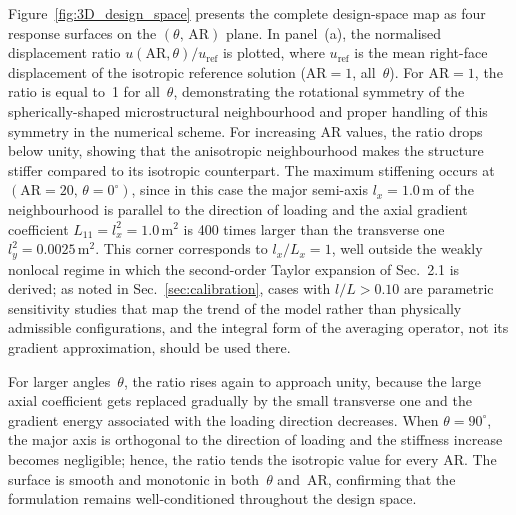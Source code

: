 \documentclass[final,3p,times,fleqn]{elsarticle}
\newcommand{\revtwo}[1]{\textcolor{revtwocolor}{#1}}
\begin{document}
Figure~\ref{fig:3D_design_space} presents the complete design-space
map as four response surfaces on the
$(\theta,\,\mathrm{AR})$ plane.
In panel~(a), the normalised displacement ratio
$u(\mathrm{AR},\theta)/u_{\mathrm{ref}}$ is plotted, where $u_{\mathrm{ref}}$
is the mean right-face displacement of the isotropic reference solution
($\mathrm{AR}=1$, all~$\theta$). For $\mathrm{AR}=1$, the ratio is equal to~1
for all~$\theta$, demonstrating the rotational symmetry of the spherically-shaped
microstructural neighbourhood and proper handling of this symmetry in the
numerical scheme.
For increasing AR values, the ratio drops below unity, showing
that the anisotropic neighbourhood makes the structure stiffer compared to
its isotropic counterpart.
The maximum stiffening occurs at
$(\mathrm{AR}=20,\,\theta=0^{\circ})$, since in this case the major semi-axis 
$l_{x} = 1.0$\,m of the neighbourhood is parallel to the direction of loading
and the axial gradient coefficient $L_{11}
=l_{x}^{2} = 1.0$\,m$^{2}$ is 400 times larger than the transverse one 
$l_{y}^{2} = 0.0025$\,m$^{2}$.
\revtwo{This corner corresponds to $l_{x}/L_{x}=1$, well outside the
weakly nonlocal regime in which the second-order Taylor expansion of
Sec.~2.1 is derived; as noted in
Sec.~\ref{sec:calibration}, cases with $l/L>0.10$ are parametric
sensitivity studies that map the trend of the model rather than
physically admissible configurations, and the integral form of the
averaging operator, not its gradient approximation, should be used
there.}

For larger angles~$\theta$, the ratio rises again to approach unity, because the
large axial coefficient gets replaced gradually by the small transverse one
and the gradient energy associated with the loading direction decreases.
When $\theta = 90^{\circ}$, the major axis is orthogonal to the direction of
loading and the stiffness increase becomes negligible; hence, the ratio tends the isotropic value for every AR.
The surface is smooth and monotonic in both~$\theta$ and~AR,
confirming that the formulation remains well-conditioned throughout
the design space.
\end{document}
